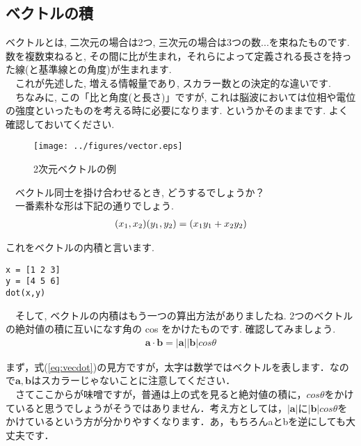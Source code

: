 \documentclass[11pt,a4paper]{ujreport}
\begin{document}
\subsection{ベクトルの積}
ベクトルとは, 二次元の場合は2つ, 三次元の場合は3つの数...を束ねたものです. \\
数を複数束ねると, その間に比が生まれ，それらによって定義される長さを持った線(と基準線との角度)が生まれます. \\
　これが先述した, 増える情報量であり, スカラー数との決定的な違いです.\\
　ちなみに, この「比と角度(と長さ)」ですが, これは脳波においては位相や電位の強度といったものを考える時に必要になります. というかそのままです. よく確認しておいてください. 
\\

\begin{figure}[H]
\label{im:vector}
  \centering
  \texttt{[image: ../figures/vector.eps]}
  \caption{2次元ベクトルの例}
\end{figure}


　ベクトル同士を掛け合わせるとき, どうするでしょうか？\\
　一番素朴な形は下記の通りでしょう.\\
\begin{eqnarray}
\label{eq:veckake}
(\mathstrut x_1 , \mathstrut x_2)(\mathstrut y_1 , \mathstrut y_2 ) = (\mathstrut x_1 \mathstrut y_1 + \mathstrut x_2 \mathstrut y_2)
\end{eqnarray}

これをベクトルの内積と言います.\\
\begin{lstlisting}[caption=\ref{eq:veckake}のMATLABコード,label=sc:veckake]
x = [1 2 3]
y = [4 5 6]
dot(x,y)
\end{lstlisting}
　そして, ベクトルの内積はもう一つの算出方法がありましたね. 2つのベクトルの絶対値の積に互いになす角の cos をかけたものです. 確認してみましょう.\\

\begin{eqnarray}
\label{eq:vecdot}
\mathbf{a}\cdot \mathbf{b} = |\mathbf{a}||\mathbf{b}|cos\theta
\end{eqnarray}

まず，式(\ref{eq:vecdot})の見方ですが，太字は数学ではベクトルを表します．なので$\mathbf{a, b}$はスカラーじゃないことに注意してください．\\
　さてここからが味噌ですが，普通は上の式を見ると絶対値の積に，$cos\theta$をかけていると思うでしょうがそうではありません．考え方としては，$|\mathbf{a}|$に$|\mathbf{b}|cos\theta$をかけているという方が分かりやすくなります．あ，もちろんaとbを逆にしても大丈夫です．
\end{document}
